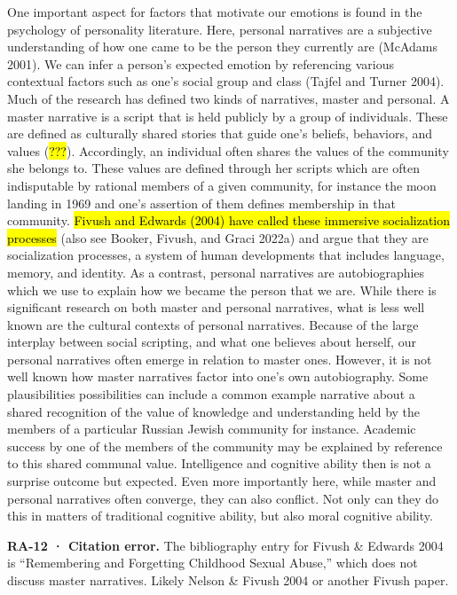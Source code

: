 \documentclass[
  letterpaper,
  DIV=11,
  numbers=noendperiod]{scrartcl}
\theoremstyle{remark}
\begin{document}
One important aspect for factors that motivate our emotions is found in
the psychology of personality literature. Here, personal narratives are
a subjective understanding of how one came to be the person they
currently are (McAdams 2001). We can infer a person's expected emotion
by referencing various contextual factors such as one's social group and
class (Tajfel and Turner 2004). Much of the research has defined two
kinds of narratives, master and personal. A master narrative is a script
that is held publicly by a group of individuals. These are defined as
culturally shared stories that guide one's beliefs, behaviors, and
values (\hl{???}). Accordingly, an individual often shares the values of
the community she belongs to. These values are defined through her
scripts which are often indisputable by rational members of a given
community, for instance the moon landing in 1969 and one's assertion of
them defines membership in that community. \hl{Fivush and Edwards (2004)
have called these immersive socialization processes} (also see Booker,
Fivush, and Graci 2022a) and argue that they are socialization
processes, a system of human developments that includes language,
memory, and identity. As a contrast, personal narratives are
autobiographies which we use to explain how we became the person that we
are. While there is significant research on both master and personal
narratives, what is less well known are the cultural contexts of
personal narratives. Because of the large interplay between social
scripting, and what one believes about herself, our personal narratives
often emerge in relation to master ones. However, it is not well known
how master narratives factor into one's own autobiography. Some
plausibilities possibilities can include a common example narrative
about a shared recognition of the value of knowledge and understanding
held by the members of a particular Russian Jewish community for
instance. Academic success by one of the members of the community may be
explained by reference to this shared communal value. Intelligence and
cognitive ability then is not a surprise outcome but expected. Even more
importantly here, while master and personal narratives often converge,
they can also conflict. Not only can they do this in matters of
traditional cognitive ability, but also moral cognitive ability.

\begin{tcolorbox}[enhanced jigsaw, arc=.35mm, bottomrule=.15mm, bottomtitle=1mm, breakable, colback=white, colbacktitle=quarto-callout-warning-color!10!white, colframe=quarto-callout-warning-color-frame, coltitle=black, left=2mm, leftrule=.75mm, opacityback=0, opacitybacktitle=0.6, rightrule=.15mm, title=\textcolor{quarto-callout-warning-color}{\faExclamationTriangle}\hspace{0.5em}{Warning}, titlerule=0mm, toprule=.15mm, toptitle=1mm]

\textbf{RA-12 · Citation error.} The bibliography entry for Fivush \&
Edwards 2004 is ``Remembering and Forgetting Childhood Sexual Abuse,''
which does not discuss master narratives. Likely Nelson \& Fivush 2004
or another Fivush paper.

\end{tcolorbox}
\end{document}
